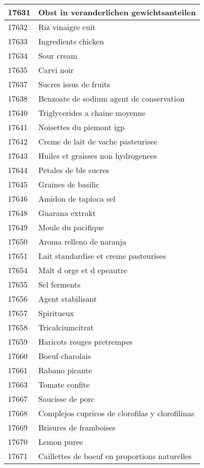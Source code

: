 \begin{longtable}{|l|l|}
17631 & Obst in veranderlichen gewichtsanteilen \\ \hline 
17632 & Riz vinaigre cuit \\ \hline 
17633 & Ingredients chicken \\ \hline 
17634 & Sour cream \\ \hline 
17635 & Carvi noir \\ \hline 
17637 & Sucres issus de fruits \\ \hline 
17638 & Benzoate de sodium agent de conservation \\ \hline 
17640 & Triglycerides a chaine moyenne \\ \hline 
17641 & Noisettes du piemont igp \\ \hline 
17642 & Creme de lait de vache pasteurisee \\ \hline 
17643 & Huiles et graisses non hydrogenees \\ \hline 
17644 & Petales de ble sucres \\ \hline 
17645 & Graines de basilic \\ \hline 
17646 & Amidon de tapioca sel \\ \hline 
17648 & Guarana extrakt \\ \hline 
17649 & Moule du pacifique \\ \hline 
17650 & Aroma relleno de naranja \\ \hline 
17651 & Lait standardise et creme pasteurises \\ \hline 
17654 & Malt d orge et d epeautre \\ \hline 
17655 & Sel ferments \\ \hline 
17656 & Agent stabilisant \\ \hline 
17657 & Spiritueux \\ \hline 
17658 & Tricalciumcitrat \\ \hline 
17659 & Haricots rouges pretrempes \\ \hline 
17660 & Boeuf charolais \\ \hline 
17661 & Rabano picante \\ \hline 
17663 & Tomate confite \\ \hline 
17667 & Saucisse de porc \\ \hline 
17668 & Complejos cupricos de clorofilas y clorofilinas \\ \hline 
17669 & Brisures de framboises \\ \hline 
17670 & Lemon puree \\ \hline 
17671 & Caillettes de boeuf en proportions naturelles \\ \hline 

\end{longtable}
